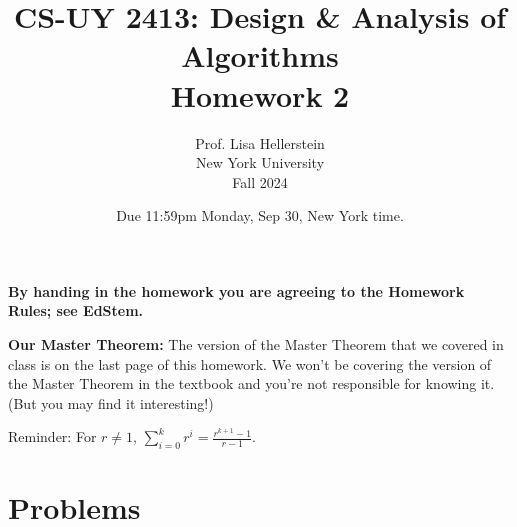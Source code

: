 \documentclass{article}
\title{CS-UY 2413: Design \& Analysis of Algorithms \\ Homework 2}
\author{Prof. Lisa Hellerstein \\ New York University \\ Fall 2024}
\date{Due 11:59pm Monday, Sep 30, New York time.}
\begin{document}
\maketitle

\textbf{By handing in the homework you are agreeing to the Homework Rules; see EdStem.}

\textbf{Our Master Theorem:} The version of the Master Theorem that we covered in class is on the last page of this homework. We won’t be covering the version of the Master Theorem in the textbook and you’re not responsible for knowing it. (But you may find it interesting!)

Reminder: For $r \neq 1$, $\sum_{i=0}^{k} r^i = \frac{r^{k+1} - 1}{r - 1}$.

\section*{Problems}
\end{document}
